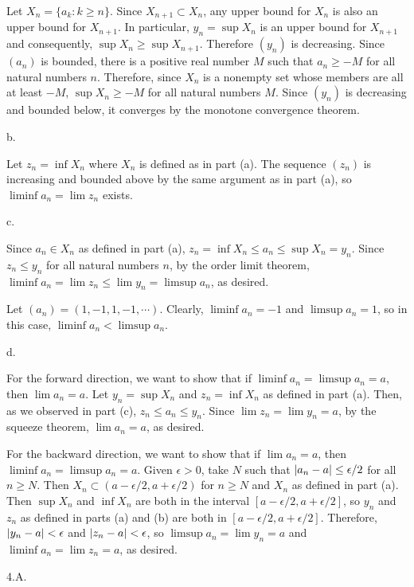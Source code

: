 Let $X_n = \{a_k : k \ge n\}$.
Since $X_{n + 1} \subset X_n$, any upper bound for $X_n$
is also an upper bound for $X_{n + 1}$.
In particular, $y_n = \sup X_n$ is an upper bound for $X_{n + 1}$
and consequently, $\sup X_n \ge \sup X_{n + 1}$.
Therefore $(y_n)$ is decreasing.
Since $(a_n)$ is bounded, there is a positive real number $M$
such that $a_n \ge -M$ for all natural numbers $n$.
Therefore, since $X_n$ is a nonempty set whose members
are all at least $-M$, $\sup X_n \ge -M$ for all natural numbers $M$.
Since $(y_n)$ is decreasing and bounded below,
it converges by the monotone convergence theorem.
\medskip
\item{} b.

Let $z_n = \inf X_n$ where $X_n$ is defined as in part (a).
The sequence $(z_n)$ is increasing and bounded above
by the same argument as in part (a),
so $\liminf a_n = \lim z_n$ exists.
\medskip
\item{} c.

Since $a_n \in X_n$ as defined in part (a),
$z_n = \inf X_n \le a_n \le \sup X_n = y_n$.
Since $z_n \le y_n$ for all natural numbers $n$,
by the order limit theorem, $\liminf a_n = \lim z_n \le \lim y_n = \limsup a_n$,
as desired.

Let $(a_n) = (1, -1, 1, -1, \cdots)$.
Clearly, $\liminf a_n = -1$ and $\limsup a_n = 1$,
so in this case, $\liminf a_n < \limsup a_n$.
\medskip
\item{} d.

For the forward direction, we want to show that
if $\liminf a_n = \limsup a_n = a$, then $\lim a_n = a$.
Let $y_n = \sup X_n$ and $z_n = \inf X_n$ as defined in part (a).
Then, as we observed in part (c), $z_n \le a_n \le y_n$.
Since $\lim z_n = \lim y_n = a$, by the squeeze theorem,
$\lim a_n = a$, as desired.

For the backward direction, we want to show that
if $\lim a_n = a$, then $\liminf a_n = \limsup a_n = a$.
Given $\epsilon > 0$, take $N$ such that
$\vert{a_n - a}\vert \le \epsilon / 2$ for all $n \ge N$.
Then $X_n \subset (a - \epsilon / 2, a + \epsilon / 2)$
for $n \ge N$ and $X_n$ as defined in part (a).
Then $\sup X_n$ and $\inf X_n$ are both in the interval
$[a - \epsilon / 2, a + \epsilon / 2]$, so
$y_n$ and $z_n$ as defined in parts (a) and (b)
are both in $[a - \epsilon / 2, a + \epsilon / 2]$.
Therefore, $\vert{y_n - a}\vert < \epsilon$
and $\vert{z_n - a}\vert < \epsilon$,
so $\limsup a_n = \lim y_n = a$ and
$\liminf a_n = \lim z_n = a$, as desired.
\bigskip
\item{4.A.}

